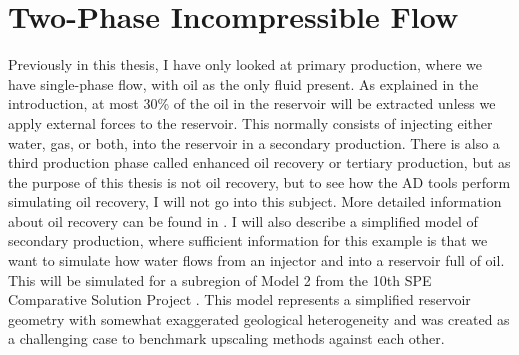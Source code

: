 \section{Two-Phase Incompressible Flow}
\label{sec:TwoPhaseSimulation}
Previously in this thesis, I have only looked at primary production, where we have single-phase flow, with oil as the only fluid present. As explained in the introduction, at most 30\% of the oil in the reservoir will be extracted unless we apply external forces to the reservoir. This normally consists of injecting either water, gas, or both, into the reservoir in a secondary production. There is also a third production phase called enhanced oil recovery or tertiary production, but as the purpose of this thesis is not oil recovery, but to see how the AD tools perform simulating oil recovery, I will not go into this subject. More detailed information about oil recovery can be found in \citet{lieMrstUrl}. I will also describe a simplified model of secondary production, where sufficient information for this example is that we want to simulate how water flows from an injector and into a reservoir full of oil. This will be simulated for a subregion of Model 2 from the 10th SPE Comparative Solution Project \emph{\citep{SPE10}}. This model represents a simplified reservoir geometry with somewhat exaggerated geological heterogeneity and was created as a challenging case to benchmark upscaling methods against each other.

